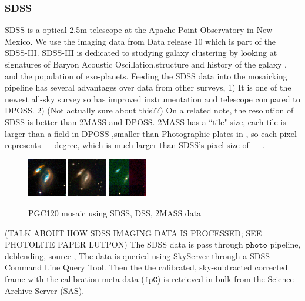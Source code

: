 \documentclass[5p]{elsarticle}
\begin{document}
	\subsubsection{SDSS}
	SDSS is a optical 
	2.5m telescope at the Apache Point Observatory in New Mexico. We use the imaging data from Data release 10 which is part of the SDSS-III. SDSS-III is dedicated to studying galaxy clustering by looking at signatures of Baryon Acoustic Oscillation,structure and history of the galaxy , and the population of exo-planets. Feeding the SDSS data into the mosaicking pipeline has several advantages over data from other surveys, 
1) It is  one of the newest all-sky survey so has improved instrumentation and telescope compared to DPOSS. 
2) (Not actually sure about this??) On a related note, the resolution of SDSS is better than 2MASS and DPOSS.  2MASS has a ``tile" size, each tile is larger than a field in DPOSS ,smaller than Photographic plates in , so each pixel represents ----degree, which is much larger than  SDSS's pixel size of ----. 
\begin{figure}[h]
	\includegraphics[width=0.15\textwidth]{figures/SDSS_120_LOW}
	\includegraphics[width=0.15\textwidth]{figures/DSS_120_BEST}	
	\includegraphics[width=0.15\textwidth]{figures/2MASS_120_BEST}
	\caption{PGC120 mosaic using SDSS, DSS, 2MASS data }
\end{figure}
(TALK ABOUT HOW SDSS IMAGING DATA IS PROCESSED; SEE PHOTOLITE PAPER LUTPON) 	 The SDSS data is pass through $\texttt{photo}$ pipeline, deblending, source , 
The data is queried using SkyServer through a SDSS Command Line Query Tool. Then the the calibrated, sky-subtracted corrected frame with the calibration meta-data ($\texttt{fpC}$) is retrieved in bulk from the Science Archive Server (SAS). 
\end{document}
